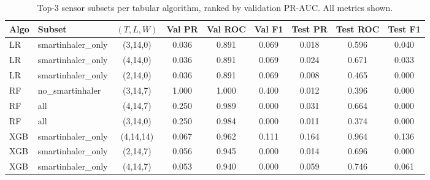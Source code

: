 \begin{table}[t]
\centering
\small
\caption{Top-3 sensor subsets per tabular algorithm, ranked by validation PR-AUC.  All metrics shown.}\label{tab:v2_ablation_topk}
\begin{tabular}{llccccccc}
\toprule
Algo & Subset & $(T,L,W)$ & Val PR & Val ROC & Val F1 & Test PR & Test ROC & Test F1 \\
\midrule
LR & smartinhaler\_only & (3,14,0) & 0.036 & 0.891 & 0.069 & 0.018 & 0.596 & 0.040 \\
LR & smartinhaler\_only & (4,14,0) & 0.036 & 0.891 & 0.069 & 0.024 & 0.671 & 0.033 \\
LR & smartinhaler\_only & (2,14,0) & 0.036 & 0.891 & 0.069 & 0.008 & 0.465 & 0.000 \\
RF & no\_smartinhaler & (3,14,7) & 1.000 & 1.000 & 0.400 & 0.012 & 0.396 & 0.000 \\
RF & all & (4,14,7) & 0.250 & 0.989 & 0.000 & 0.031 & 0.664 & 0.000 \\
RF & all & (3,14,0) & 0.250 & 0.984 & 0.000 & 0.011 & 0.374 & 0.000 \\
XGB & smartinhaler\_only & (4,14,14) & 0.067 & 0.962 & 0.111 & 0.164 & 0.964 & 0.136 \\
XGB & smartinhaler\_only & (2,14,7) & 0.056 & 0.945 & 0.000 & 0.014 & 0.696 & 0.000 \\
XGB & smartinhaler\_only & (4,14,7) & 0.053 & 0.940 & 0.000 & 0.059 & 0.746 & 0.061 \\
\bottomrule
\end{tabular}
\end{table}
